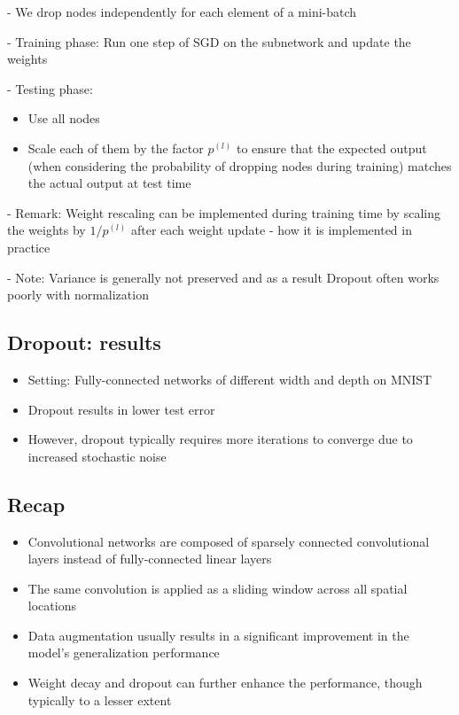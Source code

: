- We drop nodes independently for each element of a mini-batch

- Training phase: Run one step of SGD on the subnetwork and update the weights

- Testing phase: 

\begin{itemize}
    \item Use all nodes
  \item Scale each of them by the factor $p^{(l)}$ to ensure that the expected output (when considering the probability of dropping nodes during training) matches the actual output at test time
\end{itemize}

- Remark: Weight rescaling can be implemented during training time by scaling the weights by $1 / p^{(l)}$ after each weight update - how it is implemented in practice

- Note: Variance is generally not preserved and as a result Dropout often works poorly with normalization

\subsection*{Dropout: results}
\begin{itemize}
  \item Setting: Fully-connected networks of different width and depth on MNIST

  \item Dropout results in lower test error

  \item However, dropout typically requires more iterations to converge due to increased stochastic noise

\end{itemize}


\subsection*{Recap}
\begin{itemize}
  \item Convolutional networks are composed of sparsely connected convolutional layers instead of fully-connected linear layers

  \item The same convolution is applied as a sliding window across all spatial locations

  \item Data augmentation usually results in a significant improvement in the model's generalization performance

  \item Weight decay and dropout can further enhance the performance, though typically to a lesser extent

\end{itemize}